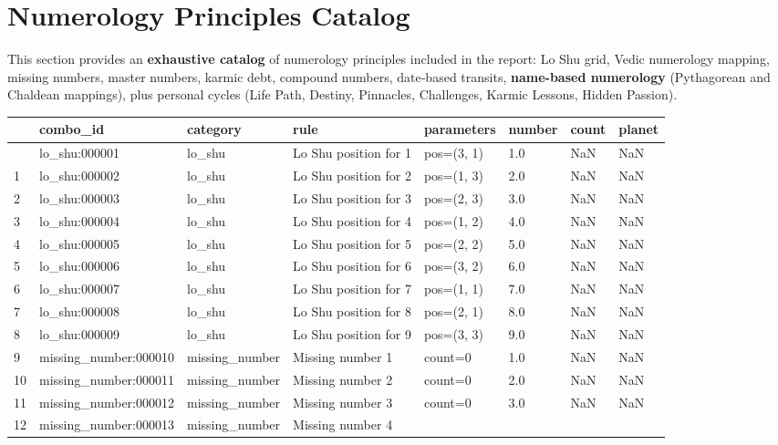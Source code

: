 \documentclass[
  11pt,
  a4paper,
  oneside,
  openany]{article}
\begin{document}
\section{Numerology Principles
Catalog}\label{numerology-principles-catalog}

This section provides an \textbf{exhaustive catalog} of numerology
principles included in the report: Lo Shu grid, Vedic numerology
mapping, missing numbers, master numbers, karmic debt, compound numbers,
date‑based transits, \textbf{name-based numerology} (Pythagorean and
Chaldean mappings), plus personal cycles (Life Path, Destiny, Pinnacles,
Challenges, Karmic Lessons, Hidden Passion).

\label{num-catalog}
\begin{longtable}[]{@{}llllllll@{}}
\toprule\noalign{}
& combo\_id & category & rule & parameters & number & count & planet \\
\midrule\noalign{}
\endhead
\bottomrule\noalign{}
\endlastfoot
0 & lo\_shu:000001 & lo\_shu & Lo Shu position for 1 & pos=(3, 1) & 1.0
& NaN & NaN \\
1 & lo\_shu:000002 & lo\_shu & Lo Shu position for 2 & pos=(1, 3) & 2.0
& NaN & NaN \\
2 & lo\_shu:000003 & lo\_shu & Lo Shu position for 3 & pos=(2, 3) & 3.0
& NaN & NaN \\
3 & lo\_shu:000004 & lo\_shu & Lo Shu position for 4 & pos=(1, 2) & 4.0
& NaN & NaN \\
4 & lo\_shu:000005 & lo\_shu & Lo Shu position for 5 & pos=(2, 2) & 5.0
& NaN & NaN \\
5 & lo\_shu:000006 & lo\_shu & Lo Shu position for 6 & pos=(3, 2) & 6.0
& NaN & NaN \\
6 & lo\_shu:000007 & lo\_shu & Lo Shu position for 7 & pos=(1, 1) & 7.0
& NaN & NaN \\
7 & lo\_shu:000008 & lo\_shu & Lo Shu position for 8 & pos=(2, 1) & 8.0
& NaN & NaN \\
8 & lo\_shu:000009 & lo\_shu & Lo Shu position for 9 & pos=(3, 3) & 9.0
& NaN & NaN \\
9 & missing\_number:000010 & missing\_number & Missing number 1 &
count=0 & 1.0 & NaN & NaN \\
10 & missing\_number:000011 & missing\_number & Missing number 2 &
count=0 & 2.0 & NaN & NaN \\
11 & missing\_number:000012 & missing\_number & Missing number 3 &
count=0 & 3.0 & NaN & NaN \\
12 & missing\_number:000013 & missing\_number & Missing number 4 &

\end{longtable}
\end{document}
